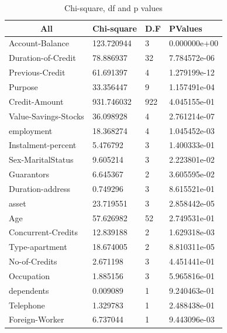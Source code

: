 \documentclass[sigconf]{acmart}
\begin{document}
\begin{table}[]
\centering
\caption{Chi-square, df and p values}
\label{tab:table7}
\begin{tabular}{|l|l|l|l|}
\hline
\multicolumn{1}{|c|}{All} & Chi-square & D.F & PValues      \\ \hline
Account-Balance          & 123.720944 & 3   & 0.000000e+00 \\ \hline
Duration-of-Credit      & 78.886937  & 32  & 7.784572e-06 \\ \hline
Previous-Credit          & 61.691397  & 4   & 1.279199e-12 \\ \hline
Purpose                   & 33.356447  & 9   & 1.157491e-04 \\ \hline
Credit-Amount            & 931.746032 & 922 & 4.045155e-01 \\ \hline
Value-Savings-Stocks    & 36.098928  & 4   & 2.761214e-07 \\ \hline
employment                & 18.368274  & 4   & 1.045452e-03 \\ \hline
Instalment-percent       & 5.476792   & 3   & 1.400333e-01 \\ \hline
Sex-MaritalStatus        & 9.605214   & 3   & 2.223801e-02 \\ \hline
Guarantors                & 6.645367   & 2   & 3.605595e-02 \\ \hline
Duration-address         & 0.749296   & 3   & 8.615521e-01 \\ \hline
asset                     & 23.719551  & 3   & 2.858442e-05 \\ \hline
Age                       & 57.626982  & 52  & 2.749531e-01 \\ \hline
Concurrent-Credits       & 12.839188  & 2   & 1.629318e-03 \\ \hline
Type-apartment            & 18.674005  & 2   & 8.810311e-05 \\ \hline
No-of-Credits             & 2.671198   & 3   & 4.451441e-01 \\ \hline
Occupation                & 1.885156   & 3   & 5.965816e-01 \\ \hline
dependents                & 0.009089   & 1   & 9.240463e-01 \\ \hline
Telephone                 & 1.329783   & 1   & 2.488438e-01 \\ \hline
Foreign-Worker            & 6.737044   & 1   & 9.443096e-03 \\ \hline
\end{tabular}
\end{table}
\end{document}
